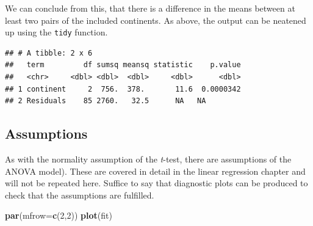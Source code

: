 \documentclass[12pt,]{krantz}
\makeatletter
\newenvironment{Shaded}{\begin{snugshade}}{\end{snugshade}}
\newcommand{\DataTypeTok}[1]{\textcolor[rgb]{0.13,0.29,0.53}{#1}}
\newcommand{\DecValTok}[1]{\textcolor[rgb]{0.00,0.00,0.81}{#1}}
\newcommand{\KeywordTok}[1]{\textcolor[rgb]{0.13,0.29,0.53}{\textbf{#1}}}
\newcommand{\NormalTok}[1]{#1}
\newcommand{\OperatorTok}[1]{\textcolor[rgb]{0.81,0.36,0.00}{\textbf{#1}}}
\newcommand{\StringTok}[1]{\textcolor[rgb]{0.31,0.60,0.02}{#1}}
\newenvironment{kframe}{%
\medskip{}
\setlength{\fboxsep}{.8em}
 \def\at@end@of@kframe{}%
 \ifinner\ifhmode%
  \def\at@end@of@kframe{\end{minipage}}%
  \begin{minipage}{\columnwidth}%
 \fi\fi%
 \def\FrameCommand##1{\hskip\@totalleftmargin \hskip-\fboxsep
 \colorbox{shadecolor}{##1}\hskip-\fboxsep
     \hskip-\linewidth \hskip-\@totalleftmargin \hskip\columnwidth}%
 \MakeFramed {\advance\hsize-\width
   \@totalleftmargin\z@ \linewidth\hsize
   \@setminipage}}%
 {\par\unskip\endMakeFramed%
 \at@end@of@kframe}
\renewenvironment{Shaded}{\begin{kframe}}{\end{kframe}}
\theoremstyle{definition}
\theoremstyle{definition}
\theoremstyle{definition}
\theoremstyle{remark}
\makeatother
\begin{document}
 

We can conclude from this, that there is a difference in the means
between at least two pairs of the included continents. As above, the
output can be neatened up using the \texttt{tidy} function.

\begin{Shaded}
\end{Shaded}

\begin{verbatim}
## # A tibble: 2 x 6
##   term         df sumsq meansq statistic    p.value
##   <chr>     <dbl> <dbl>  <dbl>     <dbl>      <dbl>
## 1 continent     2  756.  378.       11.6  0.0000342
## 2 Residuals    85 2760.   32.5      NA   NA
\end{verbatim}

  

\hypertarget{assumptions}{%
\subsection{Assumptions}\label{assumptions}}

As with the normality assumption of the \emph{t}-test, there are
assumptions of the ANOVA model). These are covered in detail in the
linear regression chapter and will not be repeated here. Suffice to say
that diagnostic plots can be produced to check that the assumptions are
fulfilled.

\begin{Shaded}
\begin{Highlighting}[]
\KeywordTok{par}\NormalTok{(}\DataTypeTok{mfrow=}\KeywordTok{c}\NormalTok{(}\DecValTok{2}\NormalTok{,}\DecValTok{2}\NormalTok{))}
\KeywordTok{plot}\NormalTok{(fit)}
\end{Highlighting}
\end{Shaded}
\end{document}
